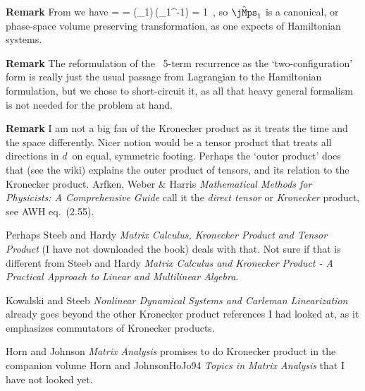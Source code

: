 {\bf Remark}                                \toCB
From  we have
\beq
{} =
\det
=
\det(\mathbf{\jMorb}_1)\,\det(\mathbf{\jMorb}_1^{-1}) = 1
\,,
so ${\hat{\mathbf{\jMps}}_1}$ is a canonical, or phase-space volume preserving
transformation, as one expects of Hamiltonian systems.


{\bf Remark}
The reformulation of the \catlatt\ 5-term recurrence 
as the `two-configuration' form  is really just the
usual passage from Lagrangian to the Hamiltonian formulation, but we
chose to short-circuit it, as all that heavy general formalism is not
needed for the problem at hand.

{\bf Remark}
I am not a big fan of the Kronecker product  as it
treats the time and the space differently. Nicer notion would be a tensor
product that treats all directions in $d$\dmn\ on equal, symmetric
footing. Perhaps the `outer product' does that (see the
 {wiki})  explains the
outer product of tensors, and its relation to the  Kronecker product.
Arfken, Weber \& Harris
{\em Mathematical Methods for Physicists: A Comprehensive Guide}
  call it
the \emph{direct tensor} or \emph{Kronecker} product, see
{AWH eq.~(2.55)}.

Perhaps Steeb and Hardy {\em Matrix Calculus, Kronecker
Product and Tensor Product} (I have not downloaded the book) deals with
that. Not sure if that is different from
Steeb and Hardy {\em Matrix Calculus and Kronecker Product
- A Practical Approach to Linear and Multilinear Algebra}.

Kowalski and Steeb
{\em Nonlinear Dynamical Systems and Carleman Linearization}
 already
goes beyond the other Kronecker product references I had looked at,
as it emphasizes commutators of Kronecker products.

Horn and Johnson {\em Matrix Analysis} 
promises to do Kronecker product in the companion volume Horn and
Johnson{HoJo94} {\em Topics in Matrix Analysis} that I have not looked
yet.

